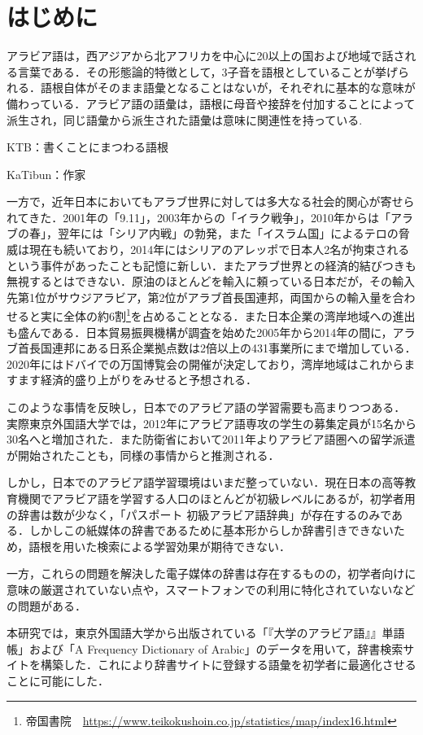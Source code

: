 \documentclass[technicalreport]{ieicej}
\begin{document}
\section{はじめに}
アラビア語は，西アジアから北アフリカを中心に20以上の国および地域で話される言葉である．その形態論的特徴として，3子音を語根としていることが挙げられる．語根自体がそのまま語彙となることはないが，それぞれに基本的な意味が備わっている．アラビア語の語彙は，語根に母音や接辞を付加することによって派生され，同じ語彙から派生された語彙は意味に関連性を持っている.

KTB：書くことにまつわる語根

KaTibun：作家

一方で，近年日本においてもアラブ世界に対しては多大なる社会的関心が寄せられてきた．2001年の「9.11」，2003年からの「イラク戦争」，2010年からは「アラブの春」，翌年には「シリア内戦」の勃発，また「イスラム国」によるテロの脅威は現在も続いており，2014年にはシリアのアレッポで日本人2名が拘束されるという事件があったことも記憶に新しい．またアラブ世界との経済的結びつきも無視するとはできない．原油のほとんどを輸入に頼っている日本だが，その輸入先第1位がサウジアラビア，第2位がアラブ首長国連邦，両国からの輸入量を合わせると実に全体の約6割\footnote{帝国書院　\url{https://www.teikokushoin.co.jp/statistics/map/index16.html}}を占めることとなる．また日本企業の湾岸地域への進出も盛んである．日本貿易振興機構が調査を始めた2005年から2014年の間に，アラブ首長国連邦にある日系企業拠点数は2倍以上の431事業所にまで増加している．2020年にはドバイでの万国博覧会の開催が決定しており，湾岸地域はこれからますます経済的盛り上がりをみせると予想される．

このような事情を反映し，日本でのアラビア語の学習需要も高まりつつある．実際東京外国語大学では，2012年にアラビア語専攻の学生の募集定員が15名から30名へと増加された．また防衛省において2011年よりアラビア語圏への留学派遣が開始されたことも，同様の事情からと推測される．

しかし，日本でのアラビア語学習環境はいまだ整っていない．現在日本の高等教育機関でアラビア語を学習する人口のほとんどが初級レベルにあるが，初学者用の辞書は数が少なく，「パスポート 初級アラビア語辞典」が存在するのみである．しかしこの紙媒体の辞書であるために基本形からしか辞書引きできないため，語根を用いた検索による学習効果が期待できない．

一方，これらの問題を解決した電子媒体の辞書は存在するものの，初学者向けに意味の厳選されていない点や，スマートフォンでの利用に特化されていないなどの問題がある．

本研究では，東京外国語大学から出版されている「『大学のアラビア語』』単語帳」および「A Frequency Dictionary of Arabic」のデータを用いて，辞書検索サイトを構築した．これにより辞書サイトに登録する語彙を初学者に最適化させることに可能にした．
\end{document}
